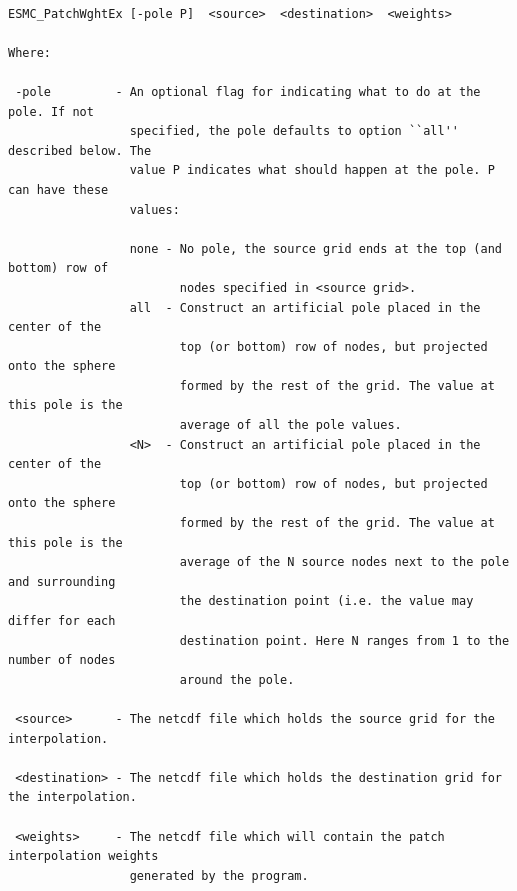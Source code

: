 \begin{verbatim}

ESMC_PatchWghtEx [-pole P]  <source>  <destination>  <weights>

Where:

 -pole         - An optional flag for indicating what to do at the pole. If not 
                 specified, the pole defaults to option ``all'' described below. The 
                 value P indicates what should happen at the pole. P can have these 
                 values:

                 none - No pole, the source grid ends at the top (and bottom) row of 
                        nodes specified in <source grid>.
                 all  - Construct an artificial pole placed in the center of the 
                        top (or bottom) row of nodes, but projected onto the sphere 
                        formed by the rest of the grid. The value at this pole is the 
                        average of all the pole values.
                 <N>  - Construct an artificial pole placed in the center of the 
                        top (or bottom) row of nodes, but projected onto the sphere 
                        formed by the rest of the grid. The value at this pole is the 
                        average of the N source nodes next to the pole and surrounding
                        the destination point (i.e. the value may differ for each
                        destination point. Here N ranges from 1 to the number of nodes 
                        around the pole. 
                  
 <source>      - The netcdf file which holds the source grid for the interpolation. 

 <destination> - The netcdf file which holds the destination grid for the interpolation. 

 <weights>     - The netcdf file which will contain the patch interpolation weights 
                 generated by the program.

\end{verbatim}


\newpage





